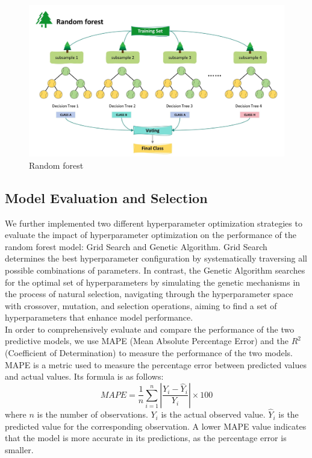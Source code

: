 \documentclass[12pt]{article}%
\begin{document}
\begin{figure}[H]
	\centering
	\includegraphics[scale=0.42]{figure//sl.jpg}
	\caption{Random forest}
	\label{sl}
\end{figure}

\subsection{Model Evaluation and Selection}

We further implemented two different hyperparameter optimization strategies to evaluate the impact of hyperparameter optimization on the performance of the random forest model: Grid Search and Genetic Algorithm. Grid Search determines the best hyperparameter configuration by systematically traversing all possible combinations of parameters. In contrast, the Genetic Algorithm searches for the optimal set of hyperparameters by simulating the genetic mechanisms in the process of natural selection, navigating through the hyperparameter space with crossover, mutation, and selection operations, aiming to find a set of hyperparameters that enhance model performance. \\

In order to comprehensively evaluate and compare the performance of the two predictive models, we use MAPE (Mean Absolute Percentage Error) and the $R^2$ (Coefficient of Determination) to measure the performance of the two models. \\

MAPE is a metric used to measure the percentage error between predicted values and actual values. Its formula is as follows:
\begin{equation}
MAPE = \frac{1}{n} \sum_{i=1}^{n} \left| \frac{Y_i - \hat{Y}_i}{Y_i} \right| \times 100
\end{equation}
where
$n$ is the number of observations.
$Y_i$ is the actual observed value.
$\hat{Y}_i$ is the predicted value for the corresponding observation.
A lower MAPE value indicates that the model is more accurate in its predictions, as the percentage error is smaller.\\
\end{document}
